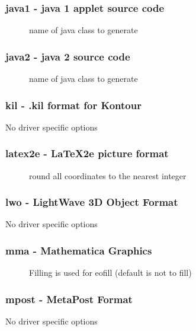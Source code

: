 \documentclass[english,a4paper]{article}
\begin{document}
\subsubsection{java1 - java 1 applet source code}
\begin{description}
\item[] 
name of java class to generate


\end{description}
\subsubsection{java2 - java 2 source code}
\begin{description}
\item[] 
name of java class to generate


\end{description}
\subsubsection{kil - .kil format for Kontour}
No driver specific options
\subsubsection{latex2e - LaTeX2e picture format}
\begin{description}
\item[] 
round all coordinates to the nearest integer


\end{description}
\subsubsection{lwo - LightWave 3D Object Format}
No driver specific options
\subsubsection{mma - Mathematica Graphics}
\begin{description}
\item[] 
Filling is used for eofill (default is not to fill)


\end{description}
\subsubsection{mpost - MetaPost Format}
No driver specific options
\end{document}
